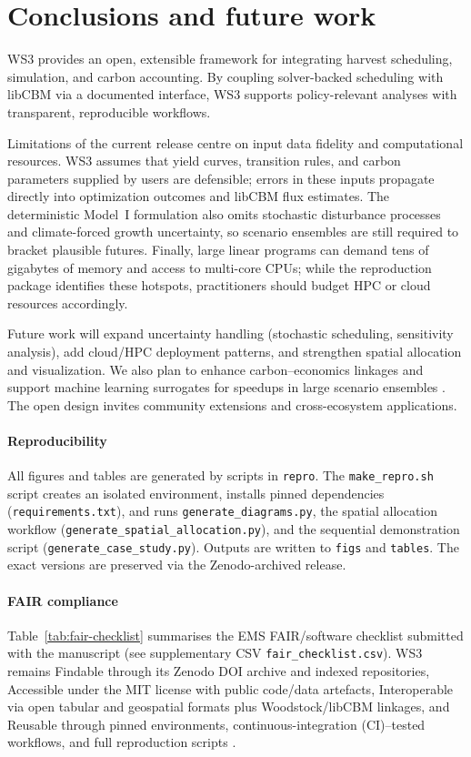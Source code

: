 \documentclass[review]{elsarticle}
\begin{document}
\section{Conclusions and future work}
WS3 provides an open, extensible framework for integrating harvest scheduling, simulation, and carbon accounting. By coupling solver-backed scheduling with libCBM via a documented interface, WS3 supports policy-relevant analyses with transparent, reproducible workflows.

Limitations of the current release centre on input data fidelity and computational resources. WS3 assumes that yield curves, transition rules, and carbon parameters supplied by users are defensible; errors in these inputs propagate directly into optimization outcomes and libCBM flux estimates. The deterministic Model~I formulation also omits stochastic disturbance processes and climate-forced growth uncertainty, so scenario ensembles are still required to bracket plausible futures. Finally, large linear programs can demand tens of gigabytes of memory and access to multi-core CPUs; while the reproduction package identifies these hotspots, practitioners should budget HPC or cloud resources accordingly.

Future work will expand uncertainty handling (stochastic scheduling, sensitivity analysis), add cloud/HPC deployment patterns, and strengthen spatial allocation and visualization. We also plan to enhance carbon–economics linkages and support machine learning surrogates for speedups in large scenario ensembles \citep{forrester2008surrogatemodelling}. The open design invites community extensions and cross-ecosystem applications.

\paragraph{Reproducibility}
All figures and tables are generated by scripts in \texttt{repro}. The \texttt{make\_repro.sh} script creates an isolated environment, installs pinned dependencies (\texttt{requirements.txt}), and runs \texttt{generate\_diagrams.py}, the spatial allocation workflow (\texttt{generate\_spatial\_allocation.py}), and the sequential demonstration script (\texttt{generate\_case\_study.py}). Outputs are written to \texttt{figs} and \texttt{tables}. The exact versions are preserved via the Zenodo-archived release.

\paragraph{FAIR compliance}
Table~\ref{tab:fair-checklist} summarises the EMS FAIR/software checklist submitted with the manuscript (see supplementary CSV \texttt{fair\_checklist.csv}). WS3 remains Findable through its Zenodo DOI archive and indexed repositories, Accessible under the MIT license with public code/data artefacts, Interoperable via open tabular and geospatial formats plus Woodstock/libCBM linkages, and Reusable through pinned environments, continuous-integration (CI)–tested workflows, and full reproduction scripts \citep{ws3_zenodo2025}.
\end{document}
